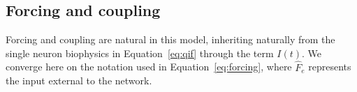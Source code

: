 \documentclass[12pt]{article}
\numberwithin{equation}{section}
\newcommand{\rev}[1]{\begingroup\color{blue}#1\endgroup}
\begin{document}

\subsection{Forcing and coupling}
Forcing and coupling are natural in this model, inheriting naturally from the single neuron biophysics in Equation~\ref{eq:qif} through the term $I(t)$. We converge here on the notation used in Equation~\ref{eq:forcing}, where $\hat F_e$ represents the input external to the network.


\end{document}
